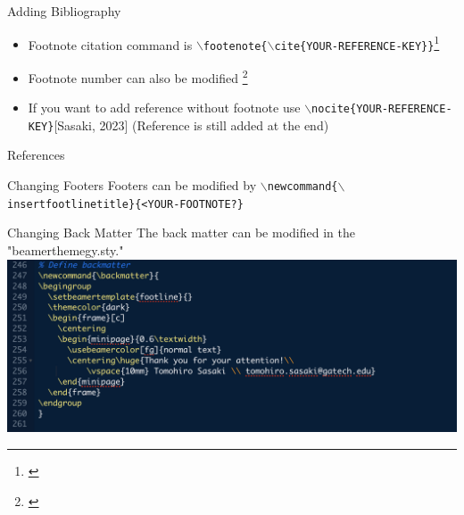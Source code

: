 \documentclass{beamer}
\begin{document}
\begin{frame}{Adding Bibliography}

    \begin{itemize}
        \item Footnote citation command is \texttt{$\backslash$footenote\{$\backslash$cite\{YOUR-REFERENCE-KEY\}\}}\footnote[1]{\cite{Sasaki.Lightsey.2022}}
        \item Footnote number can also be modified \footnote[3]{\cite{Sasaki.Lightsey.2022}}
        \item If you want to add reference without footnote use \texttt{$\backslash$nocite\{YOUR-REFERENCE-KEY\}}[Sasaki, 2023]\nocite{Sasaki.Lightsey.2023} (Reference is still added at the end)
    \end{itemize}
\end{frame}

\begin{frame}{References}
    \AtNextBibliography{\footnotesize}
    {
    \printbibliography[heading=none]
    }
\end{frame}

\begin{frame}{Changing Footers}
    Footers can be modified by
    \texttt{$\backslash$newcommand\{$\backslash$insertfootlinetitle\}\{<YOUR-FOOTNOTE?\}}
\end{frame}

\begin{frame}{Changing Back Matter}
    The back matter can be modified in the "beamerthemegy.sty."  
    \includegraphics[width=\textwidth]{plots/backmatter.png}
\end{frame}
\end{document}
